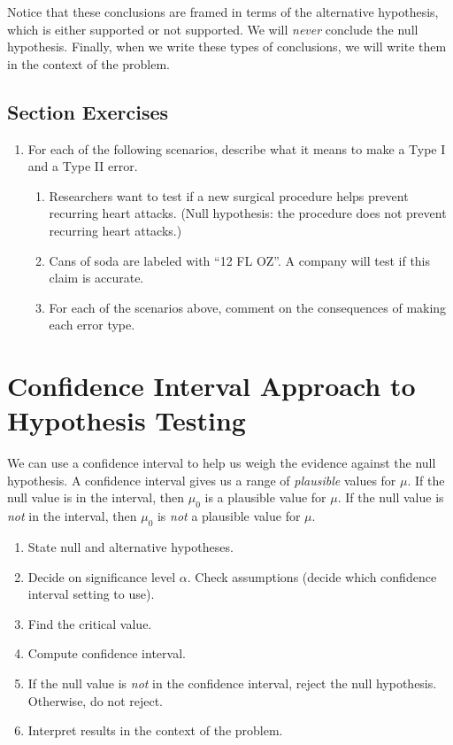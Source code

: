 \documentclass[
]{book}
\providecommand{\tightlist}{%
  \setlength{\itemsep}{0pt}\setlength{\parskip}{0pt}}
\begin{document}
Notice that these conclusions are framed in terms of the alternative hypothesis, which is either supported or not supported. We will \emph{never} conclude the null hypothesis. Finally, when we write these types of conclusions, we will write them in the context of the problem.

\subsection*{Section Exercises}\label{section-exercises-21}

\begin{enumerate}
\def\labelenumi{\arabic{enumi}.}
\tightlist
\item
  For each of the following scenarios, describe what it means to make a Type I and a Type II error.

  \begin{enumerate}
  \def\labelenumii{\alph{enumii}.}
  \tightlist
  \item
    Researchers want to test if a new surgical procedure helps prevent recurring heart attacks. (Null hypothesis: the procedure does not prevent recurring heart attacks.)
  \item
    Cans of soda are labeled with ``12 FL OZ''. A company will test if this claim is accurate.
  \item
    For each of the scenarios above, comment on the consequences of making each error type.
  \end{enumerate}
\end{enumerate}

\section{Confidence Interval Approach to Hypothesis Testing}\label{confidence-interval-approach-to-hypothesis-testing}

We can use a confidence interval to help us weigh the evidence against the null hypothesis. A confidence interval gives us a range of \emph{plausible} values for \(\mu\). If the null value is in the interval, then \(\mu_0\) is a plausible value for \(\mu\). If the null value is \emph{not} in the interval, then \(\mu_0\) is \emph{not} a plausible value for \(\mu\).

\begin{enumerate}
\def\labelenumi{\arabic{enumi}.}
\tightlist
\item
  State null and alternative hypotheses.
\item
  Decide on significance level \(\alpha\). Check assumptions (decide which confidence interval setting to use).
\item
  Find the critical value.
\item
  Compute confidence interval.
\item
  If the null value is \emph{not} in the confidence interval, reject the null hypothesis. Otherwise, do not reject.
\item
  Interpret results in the context of the problem.
\end{enumerate}
\end{document}
